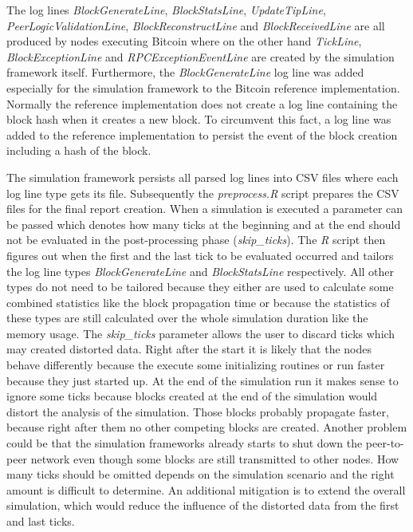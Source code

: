 The log lines \textit{BlockGenerateLine}, \textit{BlockStatsLine}, \textit{UpdateTipLine}, \textit{PeerLogicValidationLine}, \textit{BlockReconstructLine} and \textit{BlockReceivedLine} are all produced by nodes executing Bitcoin where on the other hand \textit{TickLine}, \textit{BlockExceptionLine} and \textit{RPCExceptionEventLine} are created by the simulation framework itself.
Furthermore, the \textit{BlockGenerateLine} log line was added especially for the simulation framework to the Bitcoin reference implementation.
Normally the reference implementation does not create a log line containing the block hash when it creates a new block.
To circumvent this fact, a log line was added to the reference implementation to persist the event of the block creation including a hash of the block.

The simulation framework persists all parsed log lines into CSV files where each log line type gets its file.
Subsequently the \textit{preprocess.R} script prepares the CSV files for the final report creation.
When a simulation is executed a parameter can be passed which denotes how many ticks at the beginning and at the end should not be evaluated in the post-processing phase (\textit{skip\_ticks}).
The \textit{R} script then figures out when the first and the last tick to be evaluated occurred and tailors the log line types \textit{BlockGenerateLine} and \textit{BlockStatsLine} respectively.
All other types do not need to be tailored because they either are used to calculate some combined statistics like the block propagation time or because the statistics of these types are still calculated over the whole simulation duration like the memory usage.
The \textit{skip\_ticks} parameter allows the user to discard ticks which may created distorted data.
Right after the start it is likely that the nodes behave differently because the execute some initializing routines or run faster because they just started up.
At the end of the simulation run it makes sense to ignore some ticks because blocks created at the end of the simulation would distort the analysis of the simulation.
Those blocks probably propagate faster, because right after them no other competing blocks are created.
Another problem could be that the simulation frameworks already starts to shut down the peer-to-peer network even though some blocks are still transmitted to other nodes.
How many ticks should be omitted depends on the simulation scenario and the right amount is difficult to determine.
An additional mitigation is to extend the overall simulation, which would reduce the influence of the distorted data from the first and last ticks.

